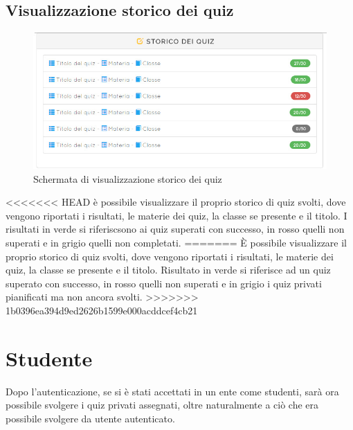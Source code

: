 \documentclass[a4paper, titlepage]{article}
\begin{document}
	 \subsection{Visualizzazione storico dei quiz}
	 \begin{figure}[!h]
	 	\centering
	 	\includegraphics[scale=0.33]{Img/screen_StoricoQuiz.png}
	 	\caption{Schermata di visualizzazione storico dei quiz}
	 \end{figure}
<<<<<<< HEAD
	 è possibile visualizzare il proprio storico di quiz svolti, dove vengono riportati i risultati, le materie dei quiz, la classe se presente e il titolo. I risultati in verde si riferiscsono ai quiz superati con successo, in rosso quelli non superati e in grigio quelli non completati.
=======
	 È possibile visualizzare il proprio storico di quiz svolti, dove vengono riportati i risultati, le materie dei quiz, la classe se presente e il titolo. Risultato in verde si riferisce ad un quiz superato con successo, in rosso quelli non superati e in grigio i quiz privati pianificati ma non ancora svolti.
>>>>>>> 1b0396ea394d9ed2626b1599e000acddcef4cb21
	  
	 \newpage
	 \section{Studente}
	 Dopo l'autenticazione, se si è stati accettati in un ente come studenti, sarà ora possibile svolgere i quiz privati assegnati, oltre naturalmente a ciò che era possibile svolgere da utente autenticato.
	 
\end{document}
